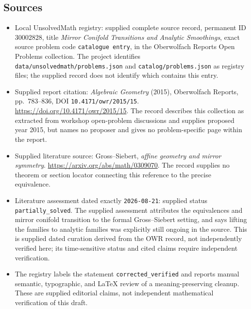 \documentclass[11pt]{article}
\begin{document}
\subsection{Sources}
\begin{itemize}
\item Local UnsolvedMath registry: supplied complete source record, permanent ID \(30002828\), title \emph{Mirror Conifold Transitions and Analytic Smoothings}, exact source problem code \texttt{catalogue entry}, in the Oberwolfach Reports Open Problems collection. The project identifies \texttt{data/unsolvedmath/problems.json} and \texttt{catalog/problems.json} as registry files; the supplied record does not identify which contains this entry.
\item Supplied report citation: \emph{Algebraic Geometry} (2015), Oberwolfach Reports, pp.\ 783--836, DOI \texttt{10.4171/owr/2015/15}. \url{https://doi.org/10.4171/owr/2015/15}. The record describes this collection as extracted from workshop open-problem discussions and supplies proposed year 2015, but names no proposer and gives no problem-specific page within the report.
\item Supplied literature source: Gross--Siebert, \emph{affine geometry and mirror symmetry}. \url{https://arxiv.org/abs/math/0309070}. The record supplies no theorem or section locator connecting this reference to the precise equivalence.
\item Literature assessment dated exactly \texttt{2026-08-21}: supplied status \texttt{partially\_solved}. The supplied assessment attributes the equivalences and mirror conifold transition to the formal Gross--Siebert setting, and says lifting the families to analytic families was explicitly still ongoing in the source. This is supplied dated curation derived from the OWR record, not independently verified here; its time-sensitive status and cited claims require independent verification.
\item The registry labels the statement \texttt{corrected\_verified} and reports manual semantic, typographic, and LaTeX review of a meaning-preserving cleanup. These are supplied editorial claims, not independent mathematical verification of this draft.
\end{itemize}
\end{document}
